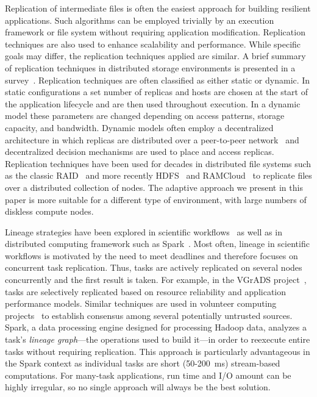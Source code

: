 \documentclass{sig-alternate}
\newcommand{\zhaonote}[1]{{\textcolor{cyan}    { ***Zhao:      #1 }}}
\newcommand{\zhaonote}[1]{}
\begin{document}
Replication of intermediate files is often the easiest approach for building resilient applications. Such algorithms can be employed trivially by an execution framework or file system without requiring application modification. Replication techniques are also used to enhance scalability and performance. While specific goals may differ, the replication techniques applied are similar. A brief summary of replication techniques in distributed storage environments is presented in a survey~\cite{survey2012}. Replication techniques are often classified as either static or dynamic. In static configurations a set number of replicas and hosts are chosen at the start of the application lifecycle and are then used throughout execution. In a dynamic model these parameters are changed depending on access patterns, storage capacity, and bandwidth.  Dynamic models often employ a decentralized architecture in which replicas are distributed over a peer-to-peer network~\cite{chord} and decentralized decision mechanisms are used to place and access replicas. Replication techniques have been used for decades in distributed file systems such as the classic RAID~\cite{raid1988} and more recently HDFS~\cite{HDFS} and RAMCloud~\cite{ramcloud2010, ramcloud2014} to replicate files over a distributed collection of nodes. %
The adaptive approach we present in this paper is more suitable for a different type of environment, with large numbers of diskless compute nodes.

Lineage strategies have been explored in scientific workflows~\cite{ramakrishnan09vgrads, calheiros13deadlines, Chimera2002} as well as in distributed computing framework such as Spark~\cite{RDD2012}. Most often, lineage in scientific workflows is motivated by the need to meet deadlines and therefore focuses on concurrent task replication. Thus, tasks are actively replicated on several nodes concurrently and the first result is taken. For example, in the VGrADS project~\cite{ramakrishnan09vgrads}, tasks are selectively replicated based on resource reliability and application performance models. Similar techniques are used in volunteer computing projects~\cite{boinc04} to establish consensus among several potentially untrusted sources. Spark, a data processing engine designed for processing Hadoop data, analyzes a task's \emph{lineage graph}---the operations used to build it---in order to reexecute entire tasks without requiring replication. This approach is particularly advantageous in the Spark context as individual tasks are short (50-200~ms) stream-based computations. %
For many-task applications, run time and I/O amount can be highly irregular, so no single approach will always be the best solution.
\end{document}

